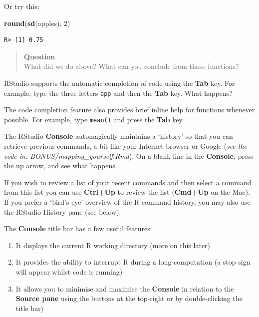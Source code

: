 \documentclass[
]{book}
\newenvironment{Shaded}{\begin{snugshade}}{\end{snugshade}}
\newcommand{\DecValTok}[1]{\textcolor[rgb]{0.00,0.00,0.81}{#1}}
\newcommand{\KeywordTok}[1]{\textcolor[rgb]{0.13,0.29,0.53}{\textbf{#1}}}
\newcommand{\NormalTok}[1]{#1}
\begin{document}
Or try this:

\begin{Shaded}
\begin{Highlighting}[]
\KeywordTok{round}\NormalTok{(}\KeywordTok{sd}\NormalTok{(apples), }\DecValTok{2}\NormalTok{)}
\end{Highlighting}
\end{Shaded}

\begin{verbatim}
R> [1] 0.75
\end{verbatim}

\begin{quote}
\textbf{Question}\\
What did we do above? What can you conclude from those functions?
\end{quote}

RStudio supports the automatic completion of code using the \textbf{Tab} key. For example, type the three letters \texttt{app} and then the \textbf{Tab} key. What happens?

The code completion feature also provides brief inline help for functions whenever possible. For example, type \texttt{mean()} and press the \textbf{Tab} key.

The RStudio \textbf{Console} automagically maintains a `history' so that you can retrieve previous commands, a bit like your Internet browser or Google (\emph{see the code in: BONUS/mapping\_yourself.Rmd}). On a blank line in the \textbf{Console}, press the up arrow, and see what happens.

If you wish to review a list of your recent commands and then select a command from this list you can use \textbf{Ctrl+Up} to review the list (\textbf{Cmd+Up} on the Mac). If you prefer a `bird's eye' overview of the R command history, you may also use the RStudio History pane (see below).

The \textbf{Console} title bar has a few useful features:

\begin{enumerate}
\def\labelenumi{\arabic{enumi}.}
\item
  It displays the current R working directory (more on this later)
\item
  It provides the ability to interrupt R during a long computation (a stop sign will appear whilst code is running)
\item
  It allows you to minimise and maximise the \textbf{Console} in relation to the \textbf{Source pane} using the buttons at the top-right or by double-clicking the title bar)
\end{enumerate}
\end{document}

